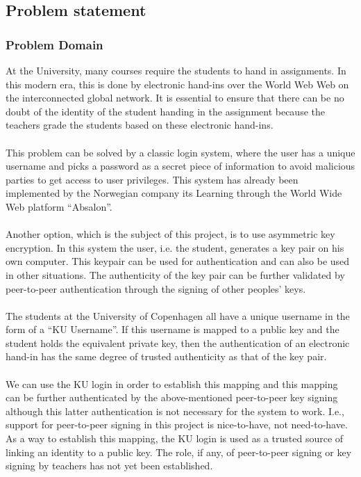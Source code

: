 \documentclass[11pt,a4paper]{article}
\begin{document}
\subsection{Problem statement}
\subsubsection{Problem Domain}
At the University, many courses require the students to hand in assignments. In this modern era, this is done by electronic hand-ins over the World Web Web on the interconnected global network. It is essential to ensure that there can be no doubt of the identity of the student handing in the assignment because the teachers grade the students based on these electronic hand-ins. \\\\

This problem can be solved by a classic login system, where the user has a unique username and picks a password as a secret piece of information to avoid malicious parties to get access to user privileges. This system has already been implemented by the Norwegian company its Learning through the World Wide Web platform ``Absalon''.\\\\

Another option, which is the subject of this project, is to use asymmetric key encryption. In this system the user, i.e. the student, generates a key pair on his own computer. This keypair can be used for authentication and can also be used in other situations. The authenticity of the key pair can be further validated by peer-to-peer authentication through the signing of other peoples' keys.\\\\

The students at the University of Copenhagen all have a unique username in the form of a ``KU Username''. If this username is mapped to a public key and the student holds the equivalent private key, then the authentication of an electronic hand-in has the same degree of trusted authenticity as that of the key pair. \\\\

We can use the KU login in order to establish this mapping and this mapping can be further authenticated by the above-mentioned peer-to-peer key signing although this latter authentication is not necessary for the system to work. I.e., support for peer-to-peer signing in this project is nice-to-have, not need-to-have. As a way to establish this mapping, the KU login is used as a trusted source of linking an identity to a public key. The role, if any, of peer-to-peer signing or key signing by teachers has not yet been established.
\end{document}
